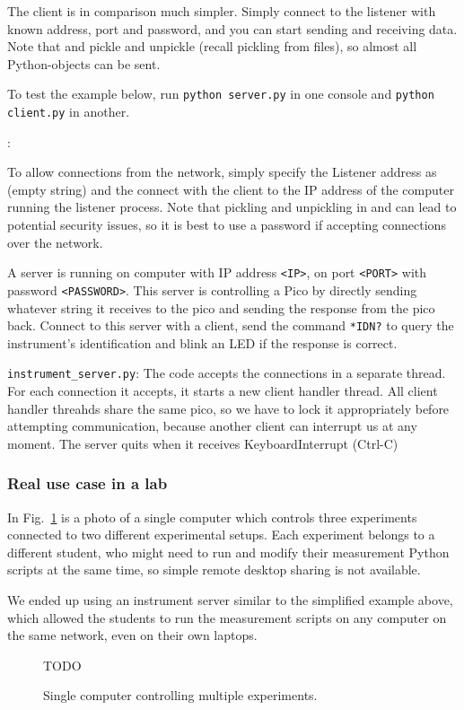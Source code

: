 The client is in comparison much simpler. Simply connect to the listener with known address, port and password, and you can start sending and receiving data. Note that  and  pickle and unpickle (recall pickling from  files), so almost all Python-objects can be sent.

To test the example below, run \verb|python server.py| in one console and \verb|python client.py| in another.

:




To allow connections from the network, simply specify the Listener address as  (empty string) and the connect with the client to the IP address of the computer running the listener process. Note that pickling and unpickling in  and  can lead to potential security issues, so it is best to use a password if accepting connections over the network.

\begin{exercise}
A server is running on computer with IP address \verb|<IP>|, on port \verb|<PORT>| with password \verb|<PASSWORD>|. This server is controlling a Pico by directly sending whatever string it receives to the pico and sending the response from the pico back. Connect to this server with a client, send the command \verb|*IDN?| to query the instrument's identification and blink an LED if the response is correct.
\end{exercise}

\verb|instrument_server.py|:
The code accepts the connections in a separate thread. For each connection it accepts, it starts a new client handler thread. All client handler threahds share the same pico, so we have to lock it appropriately before attempting communication, because another client can interrupt us at any moment. The server quits when it receives KeyboardInterrupt (Ctrl-C) 

\subsubsection{Real use case in a lab}
In Fig.~\ref{fig:networking-usecase} is a photo of a single computer which controls three experiments connected to two different experimental setups. Each experiment belongs to a different student, who might need to run and modify their measurement Python scripts at the same time, so simple remote desktop sharing is not available.

We ended up using an instrument server similar to the simplified example above, which allowed the students to run the measurement scripts on any computer on the same network, even on their own laptops.

\begin{figure}
    \label{fig:networking-usecase}
    TODO
    \caption{Single computer controlling multiple experiments.}
\end{figure}
